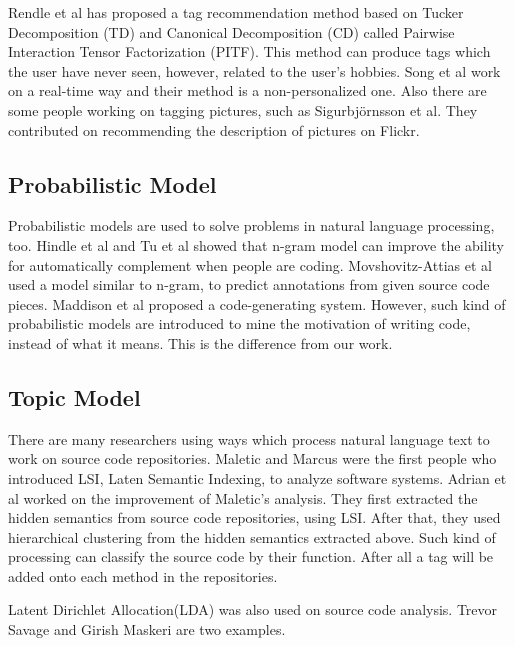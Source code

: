 Rendle et al\cite{rendle2010pairwise} has proposed a tag recommendation method
based on Tucker Decomposition (TD) and Canonical Decomposition (CD) called Pairwise
Interaction Tensor Factorization (PITF). This method can produce tags which the
user have never seen, however, related to the user's hobbies. Song et
al\cite{song2008real} work on a real-time way and their method is a non-personalized one. Also there are some people working on tagging pictures, such
as Sigurbj{\"o}rnsson et al\cite{sigurbjornsson2008flickr}. They contributed on
recommending the description of pictures on Flickr.

\subsection{Probabilistic Model}
Probabilistic models are used to solve problems in natural language processing, too. Hindle et al\cite{hindle2012naturalness} and Tu et al\cite{tu2014localness}
showed that n-gram model can improve the ability for automatically
complement when people are coding. 
Movshovitz-Attias et al\cite{movshovitz2013natural} used a model similar to n-gram,
to predict annotations from given source code pieces.
Maddison et al\cite{maddison2014structured} proposed a code-generating system.
However, such kind of probabilistic models are introduced to mine the motivation of
writing code, instead of what it means. This is the difference from our work.

\subsection{Topic Model}
There are many researchers using ways which process natural language text to 
work on source code repositories. Maletic and Marcus\cite{maletic2000using} were
the first people who introduced LSI, Laten Semantic Indexing, to analyze software
systems. Adrian et al\cite{kuhn2007semantic} worked on the improvement of Maletic's
analysis. They first extracted the hidden semantics from source code repositories,
using LSI. After that, they used hierarchical clustering from the hidden semantics
extracted above. Such kind of processing can classify the source code by their
function. After all a tag will be added onto each method in the repositories.

Latent Dirichlet Allocation(LDA) was also used on source code analysis. Trevor
Savage\cite{savage2010topic} and Girish Maskeri\cite{maskeri2008mining} are two
examples.